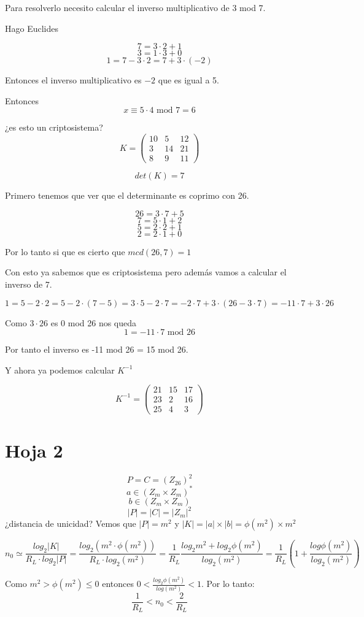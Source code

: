 \begin{problem}[10a]
	\solution
	Para resolverlo necesito calcular el inverso multiplicativo de 3 mod 7.
	
	Hago Euclides
	
	$$7 = 3 \cdot 2 +1$$
	$$3 = 1\cdot 3 +0$$
	$$1 = 7-3 \cdot 2 = 7 + 3 \cdot (-2)$$
	
	Entonces el inverso multiplicativo es $-2$ que es igual a 5.
	
	Entonces
	$$x \equiv 5 \cdot 4 \text{ mod 7} = 6$$
\end{problem}


\begin{problem}[14]
	¿es esto un criptosistema?
	\solution
	$$K = \left(\begin{matrix} 
	10 & 5 & 12\\
	3 & 14 & 21 \\
	8 & 9 & 11
	\end{matrix}\right)$$
	
	$$det(K) = 7$$
	
	Primero tenemos que ver que el determinante es coprimo con 26.
	
	$$26 = 3 \cdot 7 +5$$
	$$7 = 5\cdot 1 +2$$
	$$5 = 2\cdot 2 + 1$$
	$$2 = 2 \cdot 1 +0$$
	
	Por lo tanto si que es cierto que $mcd(26,7) = 1$
	
	Con esto ya sabemos que es criptosistema pero además vamos a calcular el inverso de 7.
	
	$$1 = 5 - 2 \cdot 2 = 5 - 2 \cdot(7-5) = 3 \cdot 5 - 2 \cdot 7 = -2 \cdot 7 + 3 \cdot(26 - 3\cdot 7) = -11\cdot 7 +3 \cdot 26$$
	
	Como $3 \cdot 26$ es 0 mod 26 nos queda
	$$1 = -11\cdot 7 \text{ mod 26}$$
	
	Por tanto el inverso es -11 mod 26 = 15 mod 26.
	
	Y ahora ya podemos calcular $K^{-1}$
	
	$$K ^{-1} = \left( \begin{matrix}
	21 & 15 & 17\\
	23 & 2 & 16\\
	25 & 4 & 3
	\end{matrix}\right)$$
	
\end{problem}

\section{Hoja 2}
\begin{problem}[9]
		$$P=C = (Z_{26})^2$$
		$$a \in (Z_m \times Z_m)^*$$
		$$b \in (Z_m \times Z_m)$$
		$$|P| = |C| = |Z_m|^2$$
		¿distancia de unicidad?
	\solution
	Vemos que $|P| = m^2$ y $|K| = |a| \times |b| = \phi(m^2) \times m^2$
	
	$$n_0 \simeq \frac{log_2 |K|}{R_L \cdot log_2|P|} = \frac{log_2(m^2 \cdot \phi(m^2))}{R_L \cdot log_2(m^2)} = \frac{1}{R_L}\frac{log_2 m^2 + log_2 \phi(m^2)}{log_2 (m^2)} = \frac{1}{R_L}(1 + \frac{log \phi(m^2)}{log_2(m^2)})$$
	
	Como $m^2 > \phi(m^2) \leq 0$ entonces $0 < \frac{log_2\phi(m^2)}{log(m^2)}<1$. Por lo tanto:
	$$\frac{1}{R_L} < n_0 < \frac{2}{R_L}$$
\end{problem}


